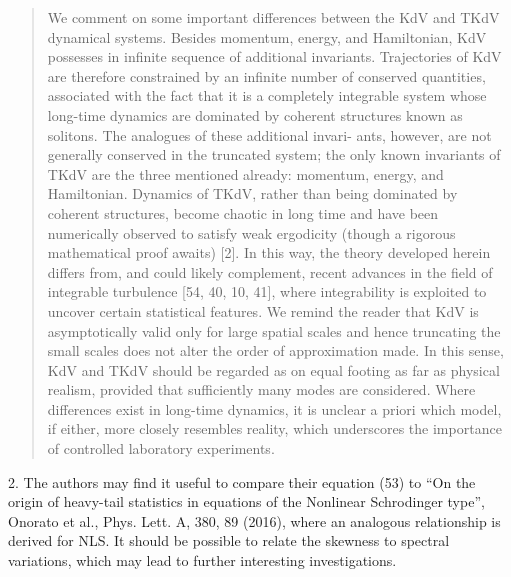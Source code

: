 \documentclass[11pt]{article}
\newcommand{\comment}[1]{{\color{blue} #1}}
\begin{document}
\begin{itemize}
\begin{quotation}
We comment on some important differences between the KdV and TKdV dynamical systems. Besides momentum, energy, and Hamiltonian, KdV possesses in infinite sequence of additional invariants. Trajectories of KdV are therefore constrained by an infinite number of conserved quantities, associated with the fact that it is a completely integrable system whose long-time dynamics are dominated by coherent structures known as solitons. The analogues of these additional invari- ants, however, are not generally conserved in the truncated system; the only known invariants of TKdV are the three mentioned already: momentum, energy, and Hamiltonian. Dynamics of TKdV, rather than being dominated by coherent structures, become chaotic in long time and have been numerically observed to satisfy weak ergodicity (though a rigorous mathematical proof awaits) [2]. In this way, the theory developed herein differs from, and could likely complement, recent advances in the field of integrable turbulence [54, 40, 10, 41], where integrability is exploited to uncover certain statistical features. We remind the reader that KdV is asymptotically valid only for large spatial scales and hence truncating the small scales does not alter the order of approximation made. In this sense, KdV and TKdV should be regarded as on equal footing as far as physical realism, provided that sufficiently many modes are considered. Where differences exist in long-time dynamics, it is unclear a priori which model, if either, more closely resembles reality, which underscores the importance of controlled laboratory experiments.
\end{quotation}
\end{itemize}


\noindent
\comment{
2. The authors may find it useful to compare their equation (53) to
 ``On the origin of heavy-tail statistics in equations of the Nonlinear Schrodinger type'', Onorato et al., Phys. Lett. A, 380, 89 (2016), where an analogous relationship is derived for NLS. It should be possible to relate the skewness to spectral variations, which may lead to further interesting investigations.
}
\end{document}
